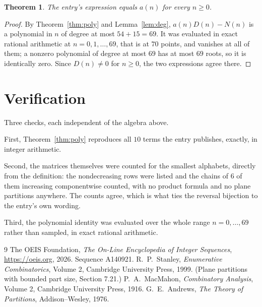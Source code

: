 \documentclass[11pt,a4paper]{article}
\theoremstyle{plain}
\newtheorem{theorem}{Theorem}
\theoremstyle{definition}
\begin{document}
\begin{theorem}
The entry's expression equals $a(n)$ for every $n\ge0$.
\end{theorem}

\begin{proof}
By Theorem~\ref{thm:poly} and Lemma~\ref{lem:deg}, $a(n)D(n)-N(n)$ is a polynomial in $n$
of degree at most $54+15=69$. It was evaluated in exact rational arithmetic at
$n=0,1,\dots,69$, that is at $70$ points, and vanishes at all of them; a nonzero polynomial
of degree at most $69$ has at most $69$ roots, so it is identically zero. Since $D(n)\neq0$
for $n\ge0$, the two expressions agree there.
\end{proof}

\section{Verification}

Three checks, each independent of the algebra above.

First, Theorem~\ref{thm:poly} reproduces all $10$ terms the entry publishes,
exactly, in integer arithmetic.

Second, the matrices themselves were counted for the smallest alphabets, directly from the
definition: the nondecreasing rows were listed and the chains of $6$ of them increasing
componentwise counted, with no product formula and no plane partitions anywhere. The counts
agree, which is what ties the reversal bijection to the entry's own wording.

Third, the polynomial identity was evaluated over the whole range $n=0,\dots,69$ rather than
sampled, in exact rational arithmetic.

\begin{thebibliography}{9}
 The OEIS Foundation, \emph{The On-Line Encyclopedia of Integer
Sequences}, \url{https://oeis.org}, 2026. Sequence A140921.
 R.~P.~Stanley, \emph{Enumerative Combinatorics}, Volume 2, Cambridge
University Press, 1999. (Plane partitions with bounded part size, Section 7.21.)
 P.~A.~MacMahon, \emph{Combinatory Analysis}, Volume 2, Cambridge
University Press, 1916.
 G.~E.~Andrews, \emph{The Theory of Partitions}, Addison--Wesley, 1976.
\end{thebibliography}
\end{document}
